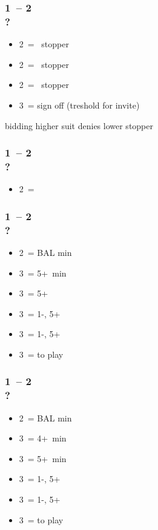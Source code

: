 \subsubsection*{1\diams\ -- 2\diams \\ ?}
\begin{itemize}
    \item 2\hearts\ = \hearts\ stopper
    \item 2\spades\ = \spades\ stopper
    \item 2\nt\ = \clubs\ stopper
    \item 3\clubs\ = sign off (treshold for invite)
\end{itemize}

bidding higher suit denies lower stopper

\subsubsection*{1\minor\ -- 2\hearts \\ ?}
\begin{itemize}
    \item 2\nt\ = \lsf
\end{itemize}

\subsubsection*{1\clubs\ -- 2\spades \\ ?}
\begin{itemize}
    \item 2\nt\ = BAL min
    \item 3\clubs\ = 5+\clubs\ min
    \item 3\diams\ = 5+\diams\ \gf
    \item 3\hearts\ = 1-\hearts, 5+\clubs\ \gf
    \item 3\spades\ = 1-\spades, 5+\clubs\ \gf
    \item 3\nt\ = to play
\end{itemize}

\subsubsection*{1\diams\ -- 2\spades \\ ?}
\begin{itemize}
    \item 2\nt\ = BAL min
    \item 3\clubs\ = 4+\clubs\ min
    \item 3\diams\ = 5+\diams\ min
    \item 3\hearts\ = 1-\hearts, 5+\diams\ \gf
    \item 3\spades\ = 1-\spades, 5+\diams\ \gf
    \item 3\nt\ = to play
\end{itemize}

